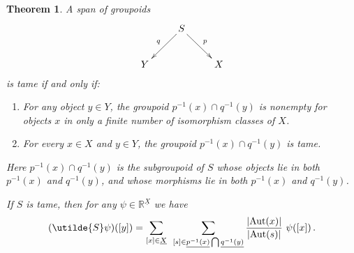 \documentclass{article}
\newcommand{\R}{{\mathbb R}}
\newcommand{\Aut}{{\rm Aut}}
\renewcommand{\u}[1]{\underline{#1}}
\newtheorem{thm}{Theorem}
\begin{document}
\begin{thm}
\label{matrix1}
A span of groupoids
\[
\xymatrix{
& S\ar[dl]_{q} \ar[dr]^{p} & \\
Y & & X
}
\]
is tame if and only if:
\begin{enumerate}
\item
For any object $y\in Y$, the groupoid $p^{-1}(x)\cap q^{-1}(y)$ is
nonempty for objects $x$ in only a finite number of isomorphism classes
of $X$.
\item For every $x \in X$ and $y \in Y$, the groupoid
$p^{-1}(x)\cap q^{-1}(y)$ is tame. 
\end{enumerate}
Here $p^{-1}(x)\cap q^{-1}(y)$ is the subgroupoid of $S$ whose objects
lie in both $p^{-1}(x)$ and $q^{-1}(y)$, and whose morphisms lie in
both $p^{-1}(x)$ and $q^{-1}(y)$.

If $S$ is tame, then for any $\psi \in \R^{\u X}$ we
have
\[   
(\utilde{S} \psi)([y]) = 
\sum_{[x] \in \u{X}} \;\,
\sum_{[s]\in\u{p^{-1}(x)}\bigcap \u{q^{-1}(y)}}
\frac{|\Aut(x)|}{|\Aut(s)|} \,\, \psi([x]) \,. 
\]
\end{thm}
\end{document}
